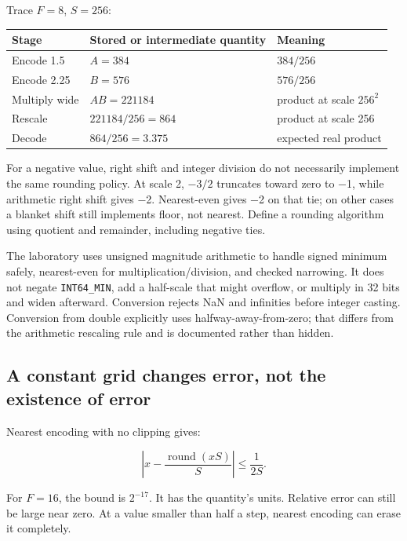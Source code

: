 Trace \(F=8\), \(S=256\):

{\def\LTcaptype{none} %
\begin{longtable}[]{@{}lll@{}}
\toprule\noalign{}
Stage & Stored or intermediate quantity & Meaning \\
\midrule\noalign{}
\endhead
\bottomrule\noalign{}
\endlastfoot
Encode 1.5 & \(A=384\) & \(384/256\) \\
Encode 2.25 & \(B=576\) & \(576/256\) \\
Multiply wide & \(AB=221184\) & product at scale \(256^2\) \\
Rescale & \(221184/256=864\) & product at scale 256 \\
Decode & \(864/256=3.375\) & expected real product \\
\end{longtable}
}

For a negative value, right shift and integer division do not necessarily implement the same rounding policy. At scale 2, \(-3/2\) truncates toward zero to −1, while arithmetic right shift gives −2. Nearest-even gives −2 on that tie; on other cases a blanket shift still implements floor, not nearest. Define a rounding algorithm using quotient and remainder, including negative ties.

The laboratory uses unsigned magnitude arithmetic to handle signed minimum safely, nearest-even for multiplication/division, and checked narrowing. It does not negate \texttt{INT64\_MIN}, add a half-scale that might overflow, or multiply in 32 bits and widen afterward. Conversion rejects NaN and infinities before integer casting. Conversion from double explicitly uses halfway-away-from-zero; that differs from the arithmetic rescaling rule and is documented rather than hidden.

\subsection{A constant grid changes error, not the existence of error}\label{05-engine-i-ch001-a-constant-grid-changes-error-not-the-existence-of-error}

Nearest encoding with no clipping gives:

\[
\left|x-\frac{\operatorname{round}(xS)}{S}\right|\le\frac{1}{2S}.
\]

For \(F=16\), the bound is \(2^{-17}\). It has the quantity's units. Relative error can still be large near zero. At a value smaller than half a step, nearest encoding can erase it completely.

